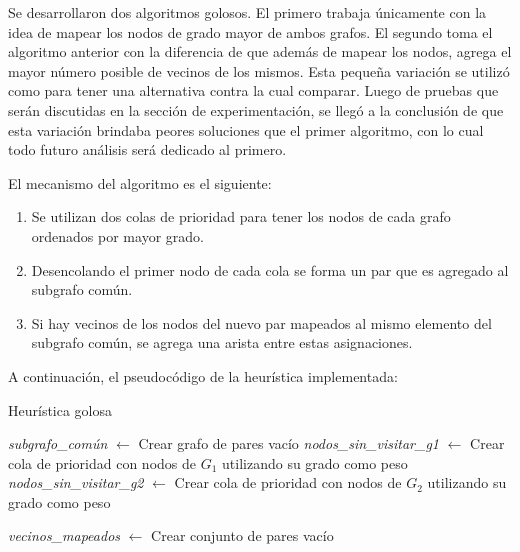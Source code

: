 Se desarrollaron dos algoritmos golosos. El primero trabaja únicamente con la idea de mapear
los nodos de grado mayor de ambos grafos. El segundo toma el algoritmo anterior con
la diferencia de que además de mapear los nodos, agrega el mayor número posible de
vecinos de los mismos. Esta pequeña variación se utilizó como para tener una
alternativa contra la cual comparar. Luego de pruebas que serán discutidas en la
sección de experimentación, se llegó a la conclusión de que esta variación
brindaba peores soluciones que el primer algoritmo, con lo cual todo futuro
análisis será dedicado al primero.

El mecanismo del algoritmo es el siguiente:
\begin{enumerate}
	\item Se utilizan dos colas de prioridad para tener los nodos de cada grafo
	ordenados por mayor grado.
	\item Desencolando el primer nodo de cada cola se forma un par que es agregado al subgrafo común.
	\item Si hay vecinos de los nodos del nuevo par mapeados al mismo elemento del
	subgrafo común, se agrega una arista entre estas asignaciones.
\end{enumerate}

A continuación, el pseudocódigo de la heurística implementada:

\begin{algorithm}[H]
	\SetAlgoVlined
	\caption{Heurística golosa}
	\textit{subgrafo\_común} $\gets$ Crear grafo de pares vacío \;
	\textit{nodos\_sin\_visitar\_g1} $\gets$ Crear cola de prioridad con nodos de $G_1$ utilizando
	su grado como peso \;
	\textit{nodos\_sin\_visitar\_g2} $\gets$ Crear cola de prioridad con nodos de $G_2$ utilizando
	su grado como peso \;

	\textit{vecinos\_mapeados} $\gets$ Crear conjunto de pares vacío \;
\end{algorithm}

